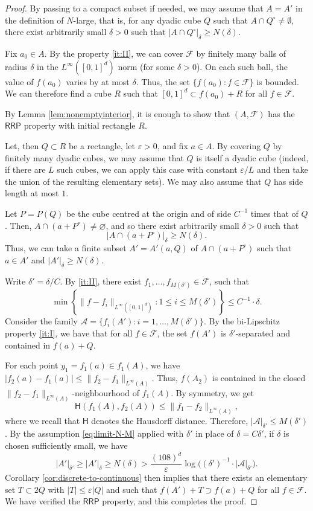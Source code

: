 \documentclass[12pt]{amsart}
\newcommand{\e}{\varepsilon}
\newcommand{\RRP}{\mathsf{RRP}}
\numberwithin{theorem}{section}
\numberwithin{equation}{section}
\begin{document}
\begin{proof}
    By passing to a compact subset if needed, we may assume that $A=A'$ in the definition of $N$-large, that is, for any dyadic cube $Q$ such that $A\cap Q^{\circ}\neq\emptyset$, there exist arbitrarily small $\delta>0$ such that $|A\cap Q^{\circ}|_{\delta}\ge N(\delta)$.

    Fix $a_0\in A$. By the property \ref{it:II}, we can cover $\mathcal{F}$ by finitely many balls of radius $\delta$ in the $L^\infty([0,1]^d)$ norm (for some $\delta>0$). On each such ball, the value of $f(a_0)$ varies by at most $\delta$. Thus, the set $\{ f(a_0): f\in\mathcal{F}\}$ is bounded. We can therefore find a cube $R$ such that $[0,1]^d \subset f(a_0)+R$ for all $f\in\mathcal{F}$.

    By Lemma \ref{lem:nonemptyinterior}, it is enough to show that $(A,\mathcal{F})$ has the $\RRP$ property with initial rectangle $R$.

    Let, then $Q\subset R$ be a rectangle, let $\e>0$, and fix $a\in A$. By covering $Q$ by finitely many dyadic cubes, we may assume that $Q$ is itself a dyadic cube (indeed, if there are $L$ such cubes, we can apply this case with constant $\e/L$ and then take the union of the resulting elementary sets). We may also assume that $Q$ has side length at most $1$.

    Let $P=P(Q)$ be the cube centred at the origin and of side $C^{-1}$ times that of $Q$. Then, $A\cap (a+P^{\circ})\neq\varnothing$, and so there exist arbitrarily small $\delta>0$ such that
    \[
        |A\cap (a+P^{\circ})|_{\delta}\ge N(\delta).
    \]
    Thus, we can take a finite subset $A'=A'(a,Q)$ of $A\cap (a+P^{\circ})$ such that $a\in A'$ and $|A'|_{\delta}\ge N(\delta)$.

    Write $\delta'=\delta/C$. By \ref{it:II}, there exist $f_1,\ldots,f_{M(\delta')}\in\mathcal{F}$, such that
    \[
        \min\left\{\|f-f_i\|_{L^\infty([0,1]^d)}: 1\le i\le M(\delta')\right\} \le C^{-1}\cdot \delta.
    \]
    Consider the family $\mathcal{A}=\{f_i(A'):i=1,\ldots,M(\delta')\}$. By the bi-Lipschitz property \ref{it:I}, we have that for all $f\in\mathcal{F}$, the set $f(A')$ is $\delta'$-separated and contained in $f(a)+Q$.

    For each point $y_1=f_1(a)\in f_1(A)$, we have $|f_2(a)-f_1(a)|\le \|f_2-f_1\|_{L^\infty(A)}$. Thus, $f(A_2)$ is contained in the closed $\|f_2-f_1\|_{L^\infty(A)}$-neighbourhood of $f_1(A)$. By symmetry, we get
    \[
        \mathsf{H}(f_1(A),f_2(A))\le \|f_1-f_2\|_{L^\infty(A)},
    \]
    where we recall that $\mathsf{H}$ denotes the Hausdorff distance. Therefore, $|\mathcal{A}|_{\delta'}\le M(\delta')$. By the assumption \eqref{eq:limit-N-M} applied with $\delta'$ in place of $\delta=C\delta'$, if $\delta$ is chosen sufficiently small, we have
    \[
        |A'|_{\delta'}\ge |A'|_{\delta} \ge  N(\delta)> \frac{(108)^d}{\e}\log \bigl((\delta')^{-1}\cdot |\mathcal{A}|_{\delta'}\bigr).
    \]
    Corollary \ref{cor:discrete-to-continuous} then implies that there exists an elementary set $T\subset 2Q$ with $|T|\le \e|Q|$ and such that $f(A')+T\supset f(a)+Q$ for all $f\in\mathcal{F}$. We have verified the $\RRP$ property, and this completes the proof.
\end{proof}
\end{document}
